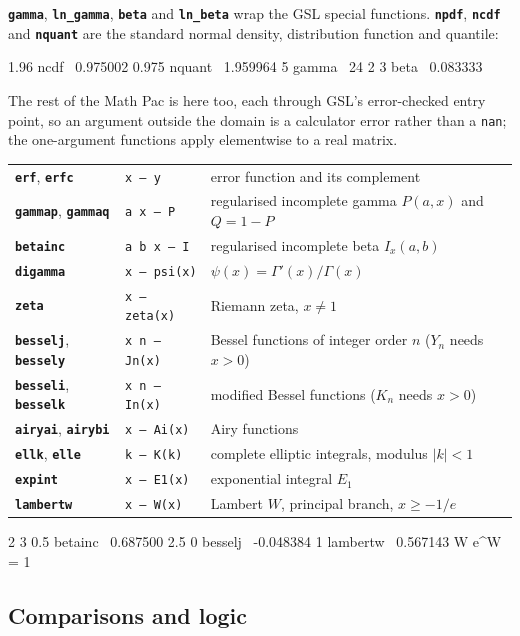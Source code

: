 \documentclass[11pt,letterpaper]{article}
\newcommand{\code}[1]{\texttt{#1}}
\newcommand{\cmd}[1]{\texttt{\textbf{#1}}}
\newcommand{\stk}[1]{\texttt{#1}}
\begin{document}
\cmd{gamma}, \cmd{ln\_gamma}, \cmd{beta} and \cmd{ln\_beta} wrap the GSL special functions. \cmd{npdf}, \cmd{ncdf} and \cmd{nquant} are the standard normal density, distribution function and quantile:
\begin{rpn}
1.96 ncdf        \ 0.975002
0.975 nquant     \ 1.959964
5 gamma          \ 24
2 3 beta         \ 0.083333
\end{rpn}
The rest of the Math Pac is here too, each through GSL's error-checked entry point, so an argument outside the domain is a calculator error rather than a \code{nan}; the one-argument functions apply elementwise to a real matrix.
\begin{center}
\begin{tabular}{@{}l>{\raggedright\arraybackslash}p{}>{\raggedright\arraybackslash}p{}@{}}
\toprule
\cmd{erf}, \cmd{erfc} & \stk{x -- y} & error function and its complement \\
\cmd{gammap}, \cmd{gammaq} & \stk{a x -- P} & regularised incomplete gamma $P(a,x)$ and $Q = 1-P$ \\
\cmd{betainc} & \stk{a b x -- I} & regularised incomplete beta $I_x(a,b)$ \\
\cmd{digamma} & \stk{x -- psi(x)} & $\psi(x) = \Gamma'(x)/\Gamma(x)$ \\
\cmd{zeta} & \stk{x -- zeta(x)} & Riemann zeta, $x \ne 1$ \\
\cmd{besselj}, \cmd{bessely} & \stk{x n -- Jn(x)} & Bessel functions of integer order $n$ ($Y_n$ needs $x>0$) \\
\cmd{besseli}, \cmd{besselk} & \stk{x n -- In(x)} & modified Bessel functions ($K_n$ needs $x>0$) \\
\cmd{airyai}, \cmd{airybi} & \stk{x -- Ai(x)} & Airy functions \\
\cmd{ellk}, \cmd{elle} & \stk{k -- K(k)} & complete elliptic integrals, modulus $|k|<1$ \\
\cmd{expint} & \stk{x -- E1(x)} & exponential integral $E_1$ \\
\cmd{lambertw} & \stk{x -- W(x)} & Lambert $W$, principal branch, $x \ge -1/e$ \\
\bottomrule
\end{tabular}
\end{center}
\begin{rpn}
2 3 0.5 betainc  \ 0.687500
2.5 0 besselj    \ -0.048384
1 lambertw       \ 0.567143   W e^W = 1
\end{rpn}

\subsection{Comparisons and logic}
\end{document}
